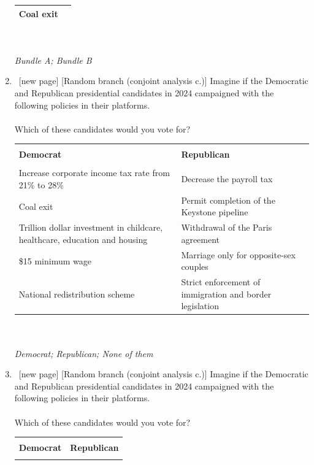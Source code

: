 \begin{enumerate}[resume]
\begin{tabular}{@{\extracolsep{5pt}}|c|c|}
        Coal exit &  \\ 
        \hline
    \end{tabular}\\ 
\\ \textit{Bundle A; Bundle B} %
\item ~[new page] [Random branch (conjoint analysis c.)] Imagine if the Democratic and Republican presidential candidates in 2024 campaigned with the following policies in their platforms.\\
\\
Which of these candidates would you vote for?\\ 
    \begin{tabular}{|>{\centering\arraybackslash}p{7cm}|>{\centering\arraybackslash}p{7cm}|}
        \hline \\[-1.8ex] 
        \textbf{Democrat} & \textbf{Republican}  \\ \hline \\[-1.8ex]
        Increase corporate income tax rate from 21\% to 28\% & Decrease the payroll tax \\ 
        Coal exit & Permit completion of the Keystone pipeline \\ 
        Trillion dollar investment in childcare, healthcare, education and housing & Withdrawal of the Paris agreement \\ 
        \$15 minimum wage & Marriage only for opposite-sex couples \\ 
        National redistribution scheme & Strict enforcement of immigration and border legislation \\ 
        \hline
    \end{tabular}\\
\\ \textit{Democrat; Republican; None of them}
\item ~[new page] [Random branch (conjoint analysis c.)] Imagine if the Democratic and Republican presidential candidates in 2024 campaigned with the following policies in their platforms.\\
\\
Which of these candidates would you vote for?\\
    \begin{tabular}{|>{\centering\arraybackslash}p{7cm}|>{\centering\arraybackslash}p{7cm}|}
    \hline \\[-1.8ex] 
        \textbf{Democrat} & \textbf{Republican}  \\ \hline \\[-1.8ex]

\end{tabular}
\end{enumerate}
